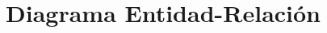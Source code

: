 \section{Diagrama Entidad-Relaci\'on}

\thispagestyle{empty}
  \begin{figure}[H] \centering
    {}
  \end{figure} 


